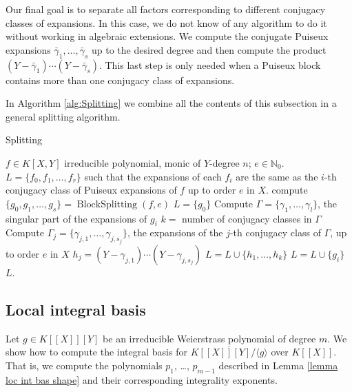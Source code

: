 \documentclass[a4paper,11pt]{amsart}%
\theoremstyle{definition}
\theoremstyle{plain}
\theoremstyle{remark}
\DeclareMathOperator{\BlockSplitting}{BlockSplitting}
\newcommand{\N}{{\mathbb N}}
\begin{document}
Our final goal is to separate all factors corresponding to different conjugacy
classes of expansions. In this case, we do not know of any algorithm to do it
without working in algebraic extensions. We compute the conjugate Puiseux
expansions $\bar{\gamma}_{1},\dots,\bar{\gamma}_{s}$ up to the desired degree
and then compute the product $(Y-\bar{\gamma}_{1})\cdots(Y-\bar{\gamma}_{s})$.
This last step is only needed when a Puiseux block contains more than one
conjugacy class of expansions.

In Algorithm \ref{alg:Splitting} we combine all the contents of this subsection in a general splitting algorithm.

\begin{algorithm}                      %
\caption{Splitting}          %
\label{alg:Splitting}
\begin{algorithmic}[1]
\REQUIRE $f \in K[X,Y]$ irreducible polynomial, monic of $Y$-degree $n$; $e \in \N_0$.
\ENSURE $L = \{f_0, f_1, \dots, f_r\}$ such that the expansions of each $f_i$ are the same as the $i$-th conjugacy class of Puiseux expansions of $f$ up to order $e$ in $X$.
\STATE compute $\{g_0, g_1, \dots, g_s\} = \BlockSplitting(f, e)$
\STATE $L = \{g_0\}$
\STATE Compute $\varGamma = \{\gamma_1, \dots, \gamma_l\}$, the singular part of the expansions of $g_i$
\STATE $k = $ number of conjugacy classes in $\varGamma$
\STATE Compute $\varGamma_j = \{\gamma_{j,1}, \dots, \gamma_{j, s_j}\}$, the expansions of the $j$-th conjugacy class of $\varGamma$, up to order $e$ in $X$
\STATE $h_j = (Y- \gamma_{j, 1}) \cdots (Y - \gamma_{j, s_j})$
\ENDFOR
\STATE $L = L \cup \{h_1, \dots, h_k\}$
\ELSE
\STATE $L = L \cup \{g_i\}$
\ENDIF
\ENDFOR
\RETURN $L$.
\end{algorithmic}
\end{algorithm}


\subsection{Local integral basis}

\label{section:lowdegree}

Let $g \in K[[X]][Y]$ be an irreducible Weierstrass polynomial of degree $m$. We show how to compute the integral basis for $\overline{K[[X]][Y]/\langle g \rangle}$ over $K[[X]]$. That is, we compute the polynomials $p_1$, \dots, $p_{m-1}$ described in Lemma \ref{lemma loc int bas shape} and their corresponding integrality exponents.
\end{document}
